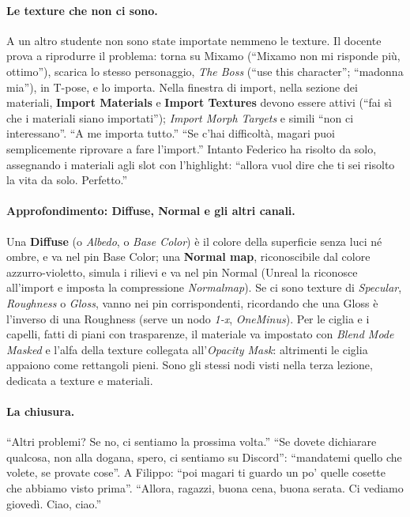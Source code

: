 \paragraph{Le texture che non ci sono.} A un altro studente non sono state importate
nemmeno le texture. Il docente prova a riprodurre il problema: torna su Mixamo (``Mixamo
non mi risponde più, ottimo''), scarica lo stesso personaggio, \emph{The Boss}
(``use this character''; ``madonna mia''), in T-pose, e lo importa. Nella finestra di
import, nella sezione dei materiali, \textbf{Import Materials} e \textbf{Import
Textures} devono essere attivi (``fai sì che i materiali siano importati''); \emph{Import
Morph Targets} e simili ``non ci interessano''. ``A me importa tutto.'' ``Se c'hai
difficoltà, magari puoi semplicemente riprovare a fare l'import.'' Intanto Federico ha
risolto da solo, assegnando i materiali agli slot con l'highlight: ``allora vuol dire che
ti sei risolto la vita da solo. Perfetto.''

\paragraph{Approfondimento: Diffuse, Normal e gli altri canali.} Una \textbf{Diffuse} (o
\emph{Albedo}, o \emph{Base Color}) è il colore della superficie senza luci né ombre, e
va nel pin Base Color; una \textbf{Normal map}, riconoscibile dal colore azzurro-violetto,
simula i rilievi e va nel pin Normal (Unreal la riconosce all'import e imposta la
compressione \emph{Normalmap}). Se ci sono texture di \emph{Specular}, \emph{Roughness} o
\emph{Gloss}, vanno nei pin corrispondenti, ricordando che una Gloss è l'inverso di una
Roughness (serve un nodo \emph{1-x}, \emph{OneMinus}). Per le ciglia e i capelli, fatti
di piani con trasparenze, il materiale va impostato con \emph{Blend Mode} \emph{Masked}
e l'alfa della texture collegata all'\emph{Opacity Mask}: altrimenti le ciglia appaiono
come rettangoli pieni. Sono gli stessi nodi visti nella terza lezione, dedicata a
texture e materiali.

\paragraph{La chiusura.} ``Altri problemi? Se no, ci sentiamo la prossima volta.''
``Se dovete dichiarare qualcosa, non alla dogana, spero, ci sentiamo su Discord'':
``mandatemi quello che volete, se provate cose''. A Filippo: ``poi magari ti guardo un po'
quelle cosette che abbiamo visto prima''. ``Allora, ragazzi, buona cena, buona serata.
Ci vediamo giovedì. Ciao, ciao.''

